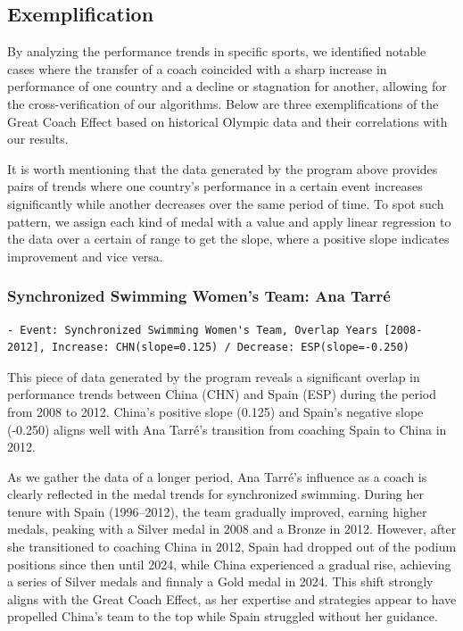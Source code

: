 \documentclass{mcmthesis}
\begin{document}
\subsection{Exemplification}
By analyzing the performance trends in specific sports, we identified notable cases where the transfer of a coach coincided with a sharp increase in performance of one country and a decline or stagnation for another, allowing for the cross-verification of our algorithms. Below are three exemplifications of the Great Coach Effect based on historical Olympic data and their correlations with our results.\

It is worth mentioning that the data generated by the program above provides pairs of trends where one country's performance in a certain event increases significantly while another decreases over the same period of time. To spot such pattern, we assign each kind of medal with a value and apply linear regression to the data over a certain of range to get the slope, where a positive slope indicates improvement and vice versa.

\subsubsection{Synchronized Swimming Women's Team: Ana Tarré}
\begin{lstlisting}
- Event: Synchronized Swimming Women's Team, Overlap Years [2008-2012], Increase: CHN(slope=0.125) / Decrease: ESP(slope=-0.250)
\end{lstlisting}

This piece of data generated by the program reveals a significant overlap in performance trends between China (CHN) and Spain (ESP) during the period from 2008 to 2012. China's positive slope (0.125) and Spain's negative slope (-0.250) aligns well with Ana Tarré's transition from coaching Spain to China in 2012.

As we gather the data of a longer period, Ana Tarré's influence as a coach is clearly reflected in the medal trends for synchronized swimming. During her tenure with Spain (1996–2012), the team gradually improved, earning higher medals, peaking with a Silver medal in 2008 and a Bronze in 2012. However, after she transitioned to coaching China in 2012, Spain had dropped out of the podium positions since then until 2024, while China experienced a gradual rise, achieving a series of Silver medals and finnaly a Gold medal in 2024. This shift strongly aligns with the Great Coach Effect, as her expertise and strategies appear to have propelled China's team to the top while Spain struggled without her guidance.
\end{document}
